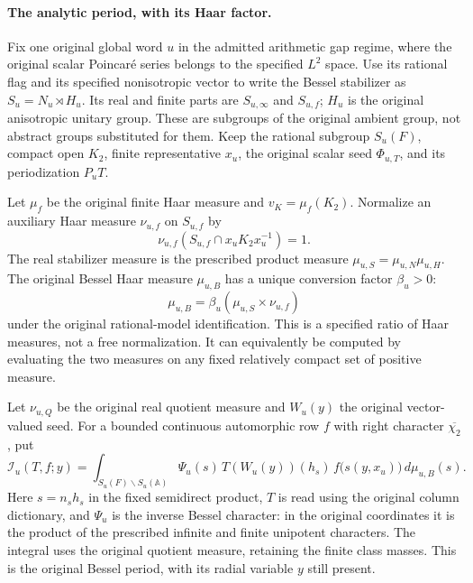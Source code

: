 \paragraph{The analytic period, with its Haar factor.}
Fix one original global word $u$ in the admitted arithmetic gap regime,
where the original scalar Poincar\'e series belongs to the specified
$L^2$ space. Use its rational flag and its specified
nonisotropic vector to write the Bessel stabilizer as
$S_u=N_u\rtimes H_u$. Its real and finite parts are
$S_{u,\infty}$ and $S_{u,f}$; $H_u$ is the original anisotropic
unitary group. These are subgroups of the original ambient group,
not abstract groups substituted for them. Keep the rational subgroup
$S_u(F)$, compact open $K_2$, finite representative $x_u$, the
original scalar seed $\Phi_{u,T}$, and its periodization $P_uT$.

Let $\mu_f$ be the original finite Haar measure and $v_K=\mu_f(K_2)$.
Normalize an auxiliary Haar measure $\nu_{u,f}$ on $S_{u,f}$ by
\[
 \nu_{u,f}(S_{u,f}\cap x_uK_2x_u^{-1})=1.
\]
The real stabilizer measure is the prescribed product measure
$\mu_{u,S}=\mu_{u,N}\mu_{u,H}$. The original Bessel Haar measure
$\mu_{u,B}$ has a unique conversion factor $\beta_u>0$:
\[
 \mu_{u,B}=\beta_u(\mu_{u,S}\times\nu_{u,f})
 \tag{TP5}
\]
under the original rational-model identification. This is a specified
ratio of Haar measures, not a free normalization. It can equivalently
be computed by evaluating the two measures on any fixed relatively
compact set of positive measure.

Let $\nu_{u,Q}$ be the original real quotient measure and $W_u(y)$
the original vector-valued seed. For a bounded continuous automorphic
row $f$ with right character $\overline{\chi_2}$, put
\[
 \mathcal I_u(T,f;y)=
 \int_{S_u(F)\backslash S_u(\mathbb A)}
  \Psi_u(s)\,T(W_u(y))(h_s)\,
                    f\bigl(s(y,x_u)\bigr)\,d\mu_{u,B}(s).
 \tag{TP6}
\]
Here $s=n_sh_s$ in the fixed semidirect product, $T$ is read using
the original column dictionary, and $\Psi_u$ is the inverse Bessel
character: in the original coordinates it is the product of the
prescribed infinite and finite unipotent characters. The integral
uses the original quotient measure, retaining the finite class
masses. This is the original Bessel period, with its radial variable
$y$ still present.


